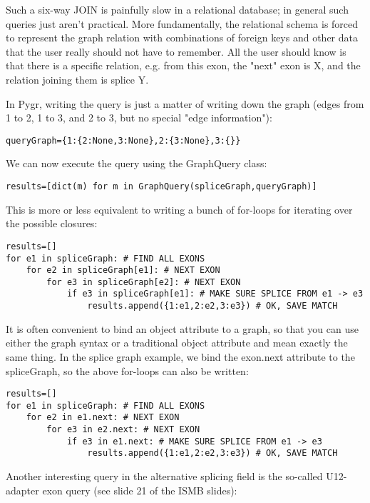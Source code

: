 \documentclass{howto}
\begin{document}
Such a six-way JOIN is painfully slow in a relational database; in general such queries just aren't practical.  More fundamentally, the relational schema is forced to represent the graph relation with combinations of foreign keys and other data that the user really should not have to remember.  All the user should know is that there is a specific relation, e.g. from this exon, the "next" exon is X, and the relation joining them is splice Y.

In Pygr, writing the query is just a matter of writing down the graph (edges from 1 to 2, 1 to 3, and 2 to 3, but no special "edge information"):

\begin{verbatim}
queryGraph={1:{2:None,3:None},2:{3:None},3:{}}
\end{verbatim}

We can now execute the query using the GraphQuery class:

\begin{verbatim}
results=[dict(m) for m in GraphQuery(spliceGraph,queryGraph)]
\end{verbatim}

This is more or less equivalent to writing a bunch of for-loops for iterating over the possible closures:

\begin{verbatim}
results=[]
for e1 in spliceGraph: # FIND ALL EXONS
    for e2 in spliceGraph[e1]: # NEXT EXON
        for e3 in spliceGraph[e2]: # NEXT EXON
            if e3 in spliceGraph[e1]: # MAKE SURE SPLICE FROM e1 -> e3
                results.append({1:e1,2:e2,3:e3}) # OK, SAVE MATCH
\end{verbatim}

It is often convenient to bind an object attribute to a graph, so that you can use either the graph syntax or a traditional object attribute and mean exactly the same thing.  In the splice graph example, we bind the exon.next attribute to the spliceGraph, so the above for-loops can also be written:

\begin{verbatim}
results=[]
for e1 in spliceGraph: # FIND ALL EXONS
    for e2 in e1.next: # NEXT EXON
        for e3 in e2.next: # NEXT EXON
            if e3 in e1.next: # MAKE SURE SPLICE FROM e1 -> e3
                results.append({1:e1,2:e2,3:e3}) # OK, SAVE MATCH
\end{verbatim}

Another interesting query in the alternative splicing field is the so-called U12-adapter exon query (see slide 21 of the ISMB slides):
\end{document}
